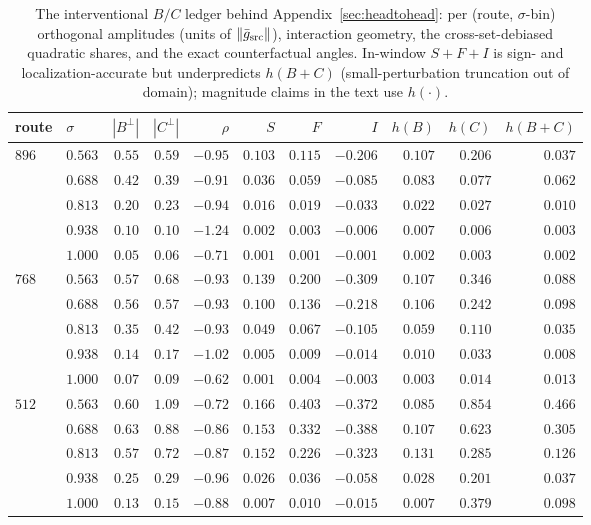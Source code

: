 \begin{table}[t]
\caption{The interventional $B/C$ ledger behind
Appendix~\ref{sec:headtohead}: per (route, $\sigma$-bin) orthogonal
amplitudes (units of $\|\bar g_{\mathrm{src}}\|$), interaction geometry, the
cross-set-debiased quadratic shares, and the exact counterfactual
angles. In-window $S{+}F{+}I$ is sign- and localization-accurate but
underpredicts $h(B{+}C)$ (small-perturbation truncation out of
domain); magnitude claims in the text use $h(\cdot)$.}
\label{tab:e9ledger}
\begin{center}
\small
\begin{tabular}{llrrrrrrrrr}
\toprule
route & $\sigma$ & $|B^{\perp}|$ & $|C^{\perp}|$ & $\rho$ & $S$ & $F$ & $I$ & $h(B)$ & $h(C)$ & $h(B{+}C)$ \\
\midrule
$896$ & $0.563$ & $0.55$ & $0.59$ & $-0.95$ & $0.103$ & $0.115$ & $-0.206$ & $0.107$ & $0.206$ & $0.037$ \\
      & $0.688$ & $0.42$ & $0.39$ & $-0.91$ & $0.036$ & $0.059$ & $-0.085$ & $0.083$ & $0.077$ & $0.062$ \\
      & $0.813$ & $0.20$ & $0.23$ & $-0.94$ & $0.016$ & $0.019$ & $-0.033$ & $0.022$ & $0.027$ & $0.010$ \\
      & $0.938$ & $0.10$ & $0.10$ & $-1.24$ & $0.002$ & $0.003$ & $-0.006$ & $0.007$ & $0.006$ & $0.003$ \\
      & $1.000$ & $0.05$ & $0.06$ & $-0.71$ & $0.001$ & $0.001$ & $-0.001$ & $0.002$ & $0.003$ & $0.002$ \\
\midrule
$768$ & $0.563$ & $0.57$ & $0.68$ & $-0.93$ & $0.139$ & $0.200$ & $-0.309$ & $0.107$ & $0.346$ & $0.088$ \\
      & $0.688$ & $0.56$ & $0.57$ & $-0.93$ & $0.100$ & $0.136$ & $-0.218$ & $0.106$ & $0.242$ & $0.098$ \\
      & $0.813$ & $0.35$ & $0.42$ & $-0.93$ & $0.049$ & $0.067$ & $-0.105$ & $0.059$ & $0.110$ & $0.035$ \\
      & $0.938$ & $0.14$ & $0.17$ & $-1.02$ & $0.005$ & $0.009$ & $-0.014$ & $0.010$ & $0.033$ & $0.008$ \\
      & $1.000$ & $0.07$ & $0.09$ & $-0.62$ & $0.001$ & $0.004$ & $-0.003$ & $0.003$ & $0.014$ & $0.013$ \\
\midrule
$512$ & $0.563$ & $0.60$ & $1.09$ & $-0.72$ & $0.166$ & $0.403$ & $-0.372$ & $0.085$ & $0.854$ & $0.466$ \\
      & $0.688$ & $0.63$ & $0.88$ & $-0.86$ & $0.153$ & $0.332$ & $-0.388$ & $0.107$ & $0.623$ & $0.305$ \\
      & $0.813$ & $0.57$ & $0.72$ & $-0.87$ & $0.152$ & $0.226$ & $-0.323$ & $0.131$ & $0.285$ & $0.126$ \\
      & $0.938$ & $0.25$ & $0.29$ & $-0.96$ & $0.026$ & $0.036$ & $-0.058$ & $0.028$ & $0.201$ & $0.037$ \\
      & $1.000$ & $0.13$ & $0.15$ & $-0.88$ & $0.007$ & $0.010$ & $-0.015$ & $0.007$ & $0.379$ & $0.098$ \\
\bottomrule
\end{tabular}
\end{center}
\end{table}


